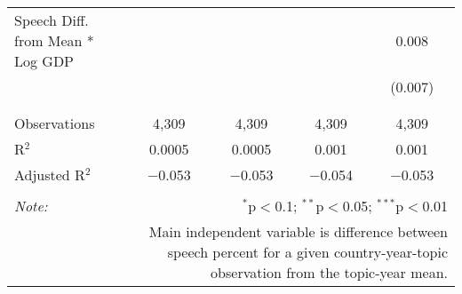 \begin{table}[!htbp]
\begin{tabular}{@{\extracolsep{5pt}}lcccc}
 Speech Diff. from Mean * Log GDP &  &  &  & 0.008 \\ 
  &  &  &  & (0.007) \\ 
  & & & & \\ 
\hline \\[-1.8ex] 
Observations & 4,309 & 4,309 & 4,309 & 4,309 \\ 
R$^{2}$ & 0.0005 & 0.0005 & 0.001 & 0.001 \\ 
Adjusted R$^{2}$ & $-$0.053 & $-$0.053 & $-$0.054 & $-$0.053 \\ 
\hline 
\hline \\[-1.8ex] 
\textit{Note:}  & \multicolumn{4}{r}{$^{*}$p$<$0.1; $^{**}$p$<$0.05; $^{***}$p$<$0.01} \\ 
 & \multicolumn{4}{r}{Main independent variable is difference between speech percent for a given country-year-topic observation from the topic-year mean.} \\ 
\end{tabular} 
\end{table} 
